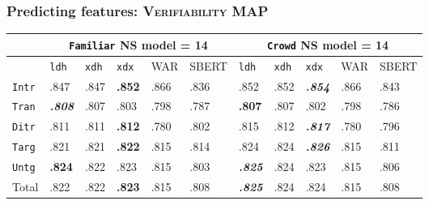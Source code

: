 \documentclass[handout,xcolor={dvipsnames}]{beamer}
\newcommand{\feat}[1]{\textsc{#1}}
\newcommand{\param}[1]{\texttt{#1}}
\begin{document}
\begin{frame}
\frametitle{Predicting features: \feat{Verifiability} MAP}

\small

\begin{table}[htb!]
\begin{center}
\setlength{\tabcolsep}{.35em}
\begin{tabular}{|l||l|l|l||l|l||l|l|l||l|l|}
\hline
 & \multicolumn{5}{c||}{\param{Fam\-il\-iar} NS model = 14} & \multicolumn{5}{c|}{\param{Crowd} NS model = 14} \\
\hline
    		& \param{ldh}	& \param{xdh} &	\param{xdx} & WAR	& {\scriptsize SBERT} & \param{ldh}	& \param{xdh} &	\param{xdx} & WAR	& {\scriptsize SBERT} \\ \hline
\hline
\param{Intr}  & .847                   & .847 & \textbf{.852} & .866 & .836 & .852                   & .852 & \textit{\textbf{.854}} & .866 & .843 \\ \hline
\param{Tran}  & \textit{\textbf{.808}} & .807 & .803          & .798 & .787 & \textbf{.807}          & .807 & .802                   & .798 & .786 \\ \hline
\param{Ditr}  & .811                   & .811 & \textbf{.812} & .780 & .802 & .815                   & .812 & \textit{\textbf{.817}} & .780 & .796 \\ \hline
\hline
\param{Targ}  & .821                   & .821 & \textbf{.822} & .815 & .814 & .824                   & .824 & \textit{\textbf{.826}} & .815 & .811 \\ \hline
\param{Untg}  & \textbf{.824}          & .822 & .823          & .815 & .803 & \textit{\textbf{.825}} & .824 & .823                   & .815 & .806 \\ \hline
\hline
Total & .822                   & .822 & \textbf{.823} & .815 & .808 & \textit{\textbf{.825}} & .824 & .824                   & .815 & .808 \\ \hline
\end{tabular}
\end{center}
\end{table}


\end{frame}
\end{document}
